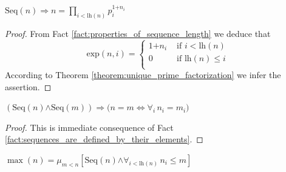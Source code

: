 \documentclass[10pt]{amsart}
\newcommand{\mforall}{\boldsymbol{\forall}}
\newcommand{\mra}{\boldsymbol{\Rightarrow}}
\newcommand{\mequiv}{\boldsymbol{\Leftrightarrow}}
\newcommand{\mand}{\boldsymbol{\wedge}}
\newcommand{\mle}{\boldsymbol{<}}
\newcommand{\mleq}{\boldsymbol{\leq}}
\newcommand{\meq}{\boldsymbol{=}}
\newcommand{\mplus}{\boldsymbol{+}}
\begin{document}
\begin{fact}\label{fact:sequences_are_defined_by_their_elements}
	$\mathrm{Seq}(n) \mra n \meq \prod_{i \mle \mathrm{lh}(n)}p_i^{1\mplus n_i}$
\end{fact}
\begin{proof}
	From Fact \ref{fact:properties_of_sequence_length} we deduce that
	$$\mathrm{exp}(n,i) \meq \begin{cases}
			1 \mplus n_i & \mbox{ if }i \mle \mathrm{lh}(n)  \\
			0            & \mbox{ if }\mathrm{lh}(n) \mleq i \\
		\end{cases}$$
	According to Theorem \ref{theorem:unique_prime_factorization} we infer the assertion.
\end{proof}

\begin{corollary}\label{corollary:extensionality_of_sequences}
	$\left(\mathrm{Seq}(n) \mand \mathrm{Seq}(m)\right) \mra \big(n \meq m \mequiv \mforall_i\,n_i \meq m_i\big)$
\end{corollary}
\begin{proof}
	This is immediate consequence of Fact \ref{fact:sequences_are_defined_by_their_elements}.
\end{proof}

\begin{definition}
	$\max(n) \meq \mu_{m \mle n}\left[\mathrm{Seq}(n) \mand \mforall_{i \mle \mathrm{lh}(n)}\,n_i \mleq m\right]$
\end{definition}
\end{document}
